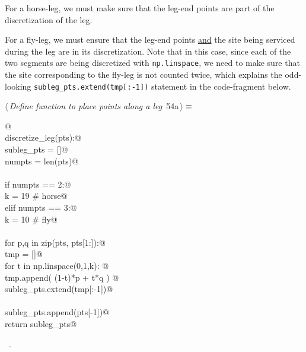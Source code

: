 \documentclass[11.5pt]{report}
\begin{document}
For a horse-leg, we must make sure that the leg-end points are part of the discretization of the leg. 

For a fly-leg, we must ensure that the leg-end points \underline{and} the site being 
serviced during the leg are in its discretization. Note that in this case, 
since each of the two segments are being discretized with \verb|np.linspace|, we need
to make sure that the site corresponding to the fly-leg is not counted twice, which
explains the odd-looking \verb|subleg_pts.extend(tmp[:-1])| statement in the code-fragment below. 

\begin{flushleft} \small
\begin{minipage}{\linewidth}\label{scrap68}\raggedright\small
{} $\langle\,${\itshape Define function to place points along a leg}\nobreak\ {\footnotesize {54a}}$\,\rangle\equiv$
\vspace{-1ex}
\begin{list}{}{} \item
\mbox{}\verb@   @\\
\mbox{}\verb@def discretize_leg(pts):@\\
\mbox{}\verb@   subleg_pts = []@\\
\mbox{}\verb@   numpts     = len(pts)@\\
\mbox{}\verb@@\\
\mbox{}\verb@   if numpts == 2:@\\
\mbox{}\verb@       k  = 19 # horse@\\
\mbox{}\verb@   elif numpts == 3:@\\
\mbox{}\verb@       k  = 10 # fly@\\
\mbox{}\verb@@\\
\mbox{}\verb@   for p,q in zip(pts, pts[1:]):@\\
\mbox{}\verb@       tmp = []@\\
\mbox{}\verb@       for t in np.linspace(0,1,k): @\\
\mbox{}\verb@           tmp.append( (1-t)*p + t*q ) @\\
\mbox{}\verb@       subleg_pts.extend(tmp[:-1])@\\
\mbox{}\verb@@\\
\mbox{}\verb@   subleg_pts.append(pts[-1])@\\
\mbox{}\verb@   return subleg_pts@\\
\mbox{}\verb@@{\NWsep}
\end{list}
\vspace{-1.5ex}
\footnotesize
\begin{list}{}{\setlength{\itemsep}{-\parsep}\setlength{\itemindent}{-\leftmargin}}
\item \NWtxtMacroRefIn\ .

\item{}
\end{list}
\end{minipage}\vspace{4ex}
\end{flushleft}
\end{document}
